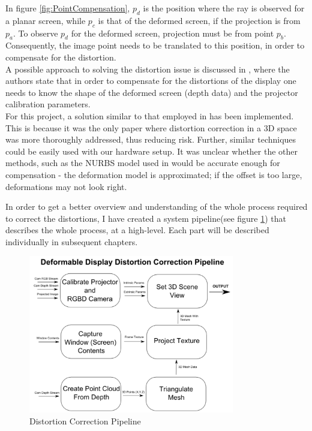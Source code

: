 \documentclass[]{article}
\begin{document}
In figure \ref{fig:PointCompensation}, $p_{d}$ is the position where the ray is observed for a planar screen, while $p_{c}$ is that of the deformed screen, if the projection is from $p_{a}$. To observe $p_{d}$ for the deformed screen, projection must be from point $p_{b}$. Consequently, the image point needs to be translated to this position, in order to compensate for the distortion.\\

A possible approach to solving the distortion issue is discussed in \cite{watanabe08}, where the authors state that in order to compensate for the distortions of the display one needs to know the shape of the deformed screen (depth data) and the projector calibration parameters. \\

For this project, a solution similar to that employed in \cite{watanabe08} has been implemented. This is because it was the only paper where distortion correction in a 3D space was more thoroughly addressed, thus reducing risk. Further, similar techniques could be easily used with our hardware setup. It was unclear whether the other methods, such as the NURBS model used in \cite{steimle13} would be accurate enough for compensation - the deformation model is approximated; if the offset is too large, deformations may not look right.

In order to get a better overview and understanding of the whole process required to correct the distortions, I have created a system pipeline(see figure \ref{fig:Pipeline}) that describes the whole process, at a high-level. Each part will be described individually in subsequent chapters.

\begin{figure}[hbtp]
    \centering
    \includegraphics[width=0.8\textwidth]{figures/DeformableDisplayPipeline.PNG}
    \caption{Distortion Correction Pipeline}
    \label{fig:Pipeline}
\end{figure}
\newpage
\end{document}
